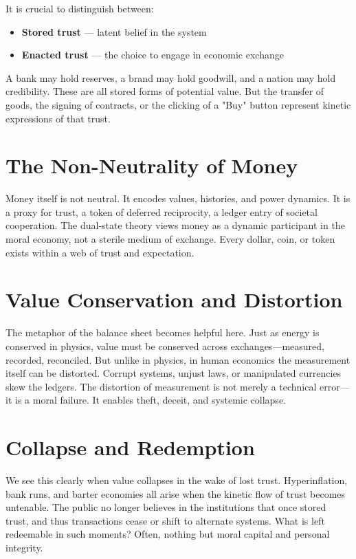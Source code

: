 \documentclass[11pt,oneside]{book}
\begin{document}
It is crucial to distinguish between:
\begin{itemize}
\item \textbf{Stored trust} — latent belief in the system
\item \textbf{Enacted trust} — the choice to engage in economic exchange
\end{itemize}

A bank may hold reserves, a brand may hold goodwill, and a nation may hold credibility. These are all stored forms of potential value. But the transfer of goods, the signing of contracts, or the clicking of a "Buy" button represent kinetic expressions of that trust.

\section{The Non-Neutrality of Money}

Money itself is not neutral. It encodes values, histories, and power dynamics. It is a proxy for trust, a token of deferred reciprocity, a ledger entry of societal cooperation. The dual-state theory views money as a dynamic participant in the moral economy, not a sterile medium of exchange. Every dollar, coin, or token exists within a web of trust and expectation.

\section{Value Conservation and Distortion}

The metaphor of the balance sheet becomes helpful here. Just as energy is conserved in physics, value must be conserved across exchanges—measured, recorded, reconciled. But unlike in physics, in human economics the measurement itself can be distorted. Corrupt systems, unjust laws, or manipulated currencies skew the ledgers. The distortion of measurement is not merely a technical error—it is a moral failure. It enables theft, deceit, and systemic collapse.

\section{Collapse and Redemption}

We see this clearly when value collapses in the wake of lost trust. Hyperinflation, bank runs, and barter economies all arise when the kinetic flow of trust becomes untenable. The public no longer believes in the institutions that once stored trust, and thus transactions cease or shift to alternate systems. What is left redeemable in such moments? Often, nothing but moral capital and personal integrity.
\end{document}
